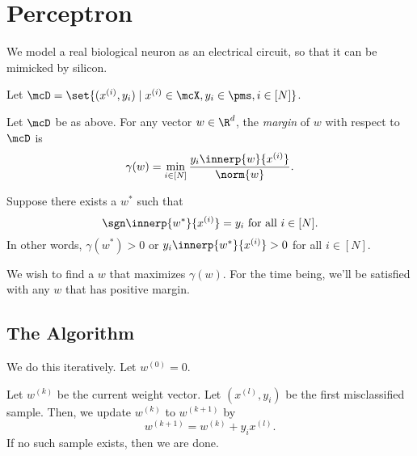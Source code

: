 \chapter{Perceptron} \label{chp:perceptron}
We model a real biological neuron as an electrical circuit, so that it can
be mimicked by silicon.
\begin{center}
\end{center}

Let $\mcD = \set{(x^{(i)}, y_i) \mid x^{(i)} \in \mcX, y_i \in \pms,
                                i \in [N]}$.
\begin{definition}[Margin] \label{def:margin}
    Let $\mcD$ be as above.
    For any vector $w \in \R^d$, the \emph{margin} of $w$ with respect to
    $\mcD$ is \[
        \gamma(w) = \min_{i \in [N]} \frac{y_i \innerp{w}{x^{(i)}}}{\norm{w}}.
    \]
\end{definition}

Suppose there exists a $w^*$ such that \[
    \sgn \innerp{w^*}{x^{(i)}} = y_i \text{ for all } i \in [N].
\]
In other words, $\gamma(w^*) > 0$ or $y_i \innerp{w^*}{x^{(i)}} > 0$ for all
$i \in [N]$.

We wish to find a $w$ that maximizes $\gamma(w)$.
For the time being, we'll be satisfied with any $w$ that has positive margin.

\section{The Algorithm} \label{sec:perceptron:algo}

We do this iteratively.
Let $w^{(0)} = 0$.

Let $w^{(k)}$ be the current weight vector.
Let $(x^{(l)}, y_i)$ be the first misclassified sample.
Then, we update $w^{(k)}$ to $w^{(k+1)}$ by \[
    w^{(k+1)} = w^{(k)} + y_i x^{(l)}.
\] If no such sample exists, then we are done.

